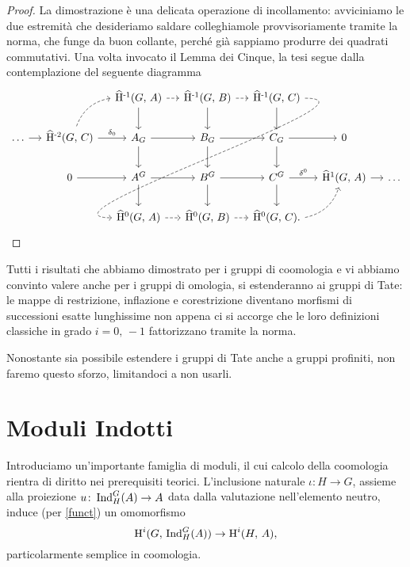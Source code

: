 \begin{proof}
	La dimostrazione è una delicata operazione di incollamento: avviciniamo le due estremità che desideriamo saldare colleghiamole provvisoriamente tramite la norma, che funge da buon collante, perché già sappiamo produrre dei quadrati commutativi. Una volta invocato il Lemma dei Cinque, la tesi segue dalla contemplazione del seguente diagramma
	\[\begin{tikzcd}[column sep = small]
	&& \Hhm(G, \, A) \dar \rar[dashed]
	& \Hhm(G, \, B) \dar \rar[dashed]
	& \Hhm(G, \, C) \dar \ar[out=0, in=180, looseness=1, dashed]{dddll} %
	&& \\
	\dots \rar
	& \Hhmm(G, \, C) \rar["\delta_0"] \arrow[ur, dashed, bend left = 30]
	& A_G \rar \dar 
	& B_G \rar \arrow[d]
	& C_G \rar \dar
	& 0 & \\
	& 0 \rar
	&A^G \rar\dar
	& B^G \rar\dar
	& C^G \rar["\delta^0"]\dar
	& \Hhu(G, \, A) \rar
	& \dots \\
	&& \Hhz(G, \, A) \rar[dashed]
	& \Hhz(G, \, B)  \rar[dashed]
	& \Hhz(G, \, C). \arrow[ur, dashed, bend right = 30]
	&& \qedhere
	\end{tikzcd}\]
\end{proof}

Tutti i risultati che abbiamo dimostrato per i gruppi di coomologia e vi abbiamo convinto valere anche per i gruppi di omologia, si estenderanno ai gruppi di Tate: le mappe di restrizione, inflazione e corestrizione diventano morfismi di successioni esatte lunghissime non appena ci si accorge che le loro definizioni classiche in grado $ i = 0,\, -1 $ fattorizzano tramite la norma.\\

\begin{profinite}
	Nonostante sia possibile estendere i gruppi di Tate anche a gruppi profiniti, non faremo questo sforzo, limitandoci a non usarli.
\end{profinite}

\section{Moduli Indotti}
Introduciamo un'importante famiglia di moduli, il cui calcolo della coomologia rientra di diritto nei prerequisiti teorici. L'inclusione naturale $ \iota \colon H \to G $, assieme alla proiezione $ u \colon \operatorname{Ind}_H^G(A) \to A $ data dalla valutazione nell'elemento neutro, induce (per \ref{funct}) un omomorfismo \[ \operatorname{H}^i(G, \, \operatorname{Ind}_H^G(A)) \to \operatorname{H}^i(H, \, A), \]
particolarmente semplice in coomologia.

